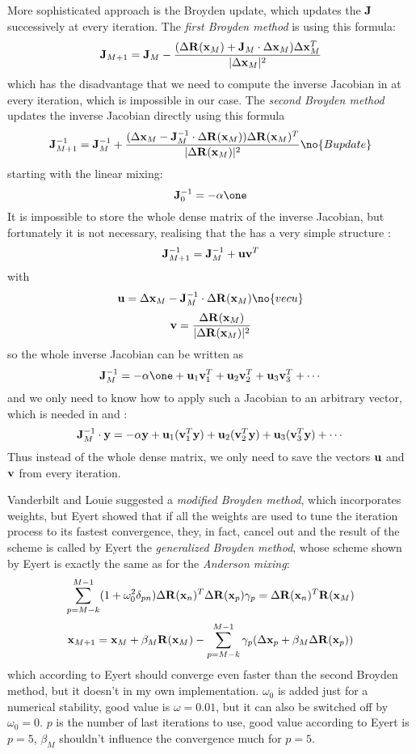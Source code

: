 More sophisticated approach is the Broyden update, which 
updates the ${\bf J}$ successively at every iteration. The {\it first Broyden
method\/} is using this formula: 
$${\bf J}_{M+1}={\bf J}_M-{(\Delta{\bf R}({\bf x}_M)+{\bf J}_M\cdot\Delta{\bf x}_M)\Delta{\bf x}_M^T\over 
|\Delta{\bf x}_M|^2}$$
which has the disadvantage that we need to compute the inverse Jacobian in
 at every iteration, which is impossible in our case. The {\it
second Broyden method\/} updates the inverse Jacobian directly using this
formula
$$\J_{M+1}^{-1}=\J_M^{-1}+{(\Delta\x_M-\J_M^{-1}\cdot\Delta\R(\x_M))
\Delta\R(\x_M)^T\over |\Delta\R(\x_M)|^2}\no{Bupdate}$$
starting with the linear mixing:
$$\J_0^{-1}=-\alpha\one$$
It is impossible to store the whole dense matrix of the inverse Jacobian, but
fortunately it is not necessary, realising that the  has a very
simple structure \cite{srivastava}:
$${\bf J}_{M+1}^{-1}={\bf J}_M^{-1}+{\bf u}{\bf v}^T$$ 
with
$${\bf u}=\Delta\x_M-\J_M^{-1}\cdot\Delta\R(\x_M)\no{vecu}$$
$${\bf v}={\Delta{\bf R}({\bf x}_M)\over |\Delta{\bf R}({\bf x}_M)|^2}$$
so the whole inverse Jacobian can be written as
$$\J_M^{-1}=-\alpha\one+{\bf u}_1{\bf v}_1^T+{\bf u}_2{\bf v}_2^T+
{\bf u}_3{\bf v}_3^T+\cdots$$
and we only need to know how to apply such a Jacobian to an arbitrary vector,
which is needed in  and :
$${\bf J}_M^{-1}\cdot{\bf y}=-\alpha{\bf y}+{\bf u}_1({\bf v}_1^T{\bf y})
+{\bf u}_2({\bf v}_2^T{\bf y})+ {\bf u}_3({\bf v}_3^T{\bf y})+\cdots$$
Thus instead of the whole dense matrix, we only need to save the vectors ${\bf
u}$ and ${\bf v}$ from every iteration.

Vanderbilt and Louie \cite{vanderbiltlouie} suggested a {\it modified Broyden
method}, which incorporates weights, but Eyert \cite{eyert} showed that if all
the weights are used to tune the iteration process to its fastest convergence,
they, in fact, cancel out and the result of the scheme is called by Eyert the
{\it generalized Broyden method}, whose scheme shown by Eyert is exactly the
same as for the {\it Anderson mixing}:
$$\sum_{p=M-k}^{M-1}(1+\omega_0^2\delta_{pn})\Delta{\bf R}({\bf x}_n)^T\Delta{\bf R}({\bf x}_p)
\gamma_p =\Delta{\bf R}({\bf x}_n)^T{\bf R}({\bf x}_M) $$
$${\bf x}_{M+1}={\bf x}_M+\beta_M{\bf R}({\bf x}_M)-\sum_{p=M-k}^{M-1}\gamma_p
(\Delta{\bf x}_p+\beta_M\Delta{\bf R}({\bf x}_p)) $$
which according to Eyert should converge even faster than the second Broyden
method, but it doesn't in my own implementation. $\omega_0$ is added just for a
numerical stability, good value is $\omega=0.01$, but it can also be switched
off by $\omega_0=0$. $p$ is the number of last iterations to use, good value
according to Eyert is $p=5$, $\beta_M$ shouldn't influence the convergence
much for $p=5$.


